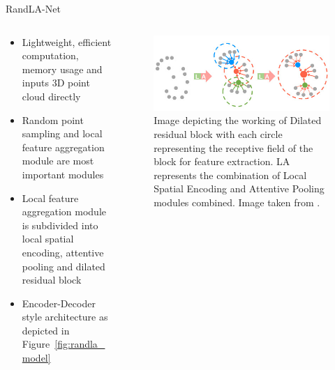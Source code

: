\documentclass[aspectratio=169]{beamer}
\begin{document}
\begin{frame}{RandLA-Net}
    \begin{columns}
        \begin{column}{0.6\textwidth}
            \begin{itemize}
                \item Lightweight, efficient computation, memory usage and inputs 3D point cloud directly
                \item Random point sampling and local feature aggregation module are most important modules
                \item Local feature aggregation module is subdivided into local spatial encoding, attentive pooling and dilated residual block
                \item Encoder-Decoder style architecture as depicted in Figure~\ref{fig:randla_model}
            \end{itemize}
        \end{column}
        \begin{column}{0.4\textwidth}
            \begin{figure}
                \centering
                \includegraphics[scale=0.35]{images/randlanet_dires_effect.jpg}
                \caption{Image depicting the working of Dilated residual block with each circle representing the receptive
                field of the block for feature extraction. LA represents the combination of Local Spatial Encoding and
                Attentive Pooling modules combined. Image taken from \cite{Hu_2020_CVPR_Randla}.}
                \label{fig:dires_effect}
            \end{figure}
        \end{column}
    \end{columns}
    
\end{frame}
\end{document}
